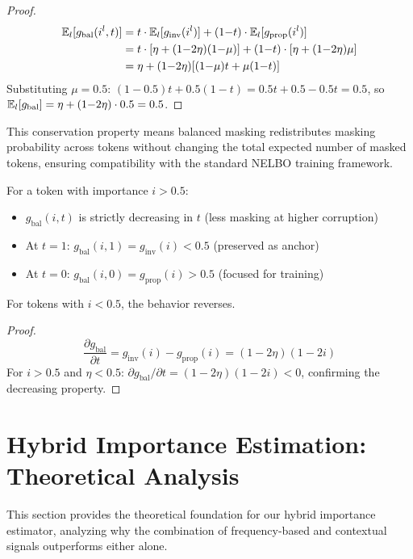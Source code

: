\begin{proof}
\begin{align}
    \mathbb{E}_l[g_{\text{bal}}(i^l, t)] &= t \cdot \mathbb{E}_l[g_{\text{inv}}(i^l)] + (1{-}t) \cdot \mathbb{E}_l[g_{\text{prop}}(i^l)] \\
    &= t \cdot [\eta + (1{-}2\eta)(1{-}\mu)] + (1{-}t) \cdot [\eta + (1{-}2\eta)\mu] \\
    &= \eta + (1{-}2\eta)[(1{-}\mu)t + \mu(1{-}t)]
\end{align}
Substituting $\mu = 0.5$: $(1{-}0.5)t + 0.5(1{-}t) = 0.5t + 0.5 - 0.5t = 0.5$, so $\mathbb{E}_l[g_{\text{bal}}] = \eta + (1{-}2\eta) \cdot 0.5 = 0.5$.
\end{proof}

This conservation property means balanced masking redistributes masking probability across tokens without changing the total expected number of masked tokens, ensuring compatibility with the standard NELBO training framework.

\begin{lemma}
\label{lem:monotonicity}
For a token with importance $i > 0.5$:
\begin{itemize}
    \item $g_{\text{bal}}(i, t)$ is strictly decreasing in $t$ (less masking at higher corruption)
    \item At $t=1$: $g_{\text{bal}}(i, 1) = g_{\text{inv}}(i) < 0.5$ (preserved as anchor)
    \item At $t=0$: $g_{\text{bal}}(i, 0) = g_{\text{prop}}(i) > 0.5$ (focused for training)
\end{itemize}
For tokens with $i < 0.5$, the behavior reverses.
\end{lemma}

\begin{proof}
\begin{equation}
    \frac{\partial g_{\text{bal}}}{\partial t} = g_{\text{inv}}(i) - g_{\text{prop}}(i) = (1{-}2\eta)(1{-}2i)
\end{equation}
For $i > 0.5$ and $\eta < 0.5$: $\partial g_{\text{bal}}/\partial t = (1{-}2\eta)(1{-}2i) < 0$, confirming the decreasing property.
\end{proof}

\section{Hybrid Importance Estimation: Theoretical Analysis}
\label{app:hybrid}

This section provides the theoretical foundation for our hybrid importance estimator, analyzing why the combination of frequency-based and contextual signals outperforms either alone.


